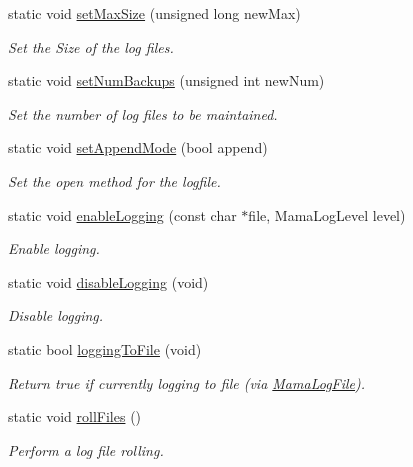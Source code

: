 \begin{DoxyCompactItemize}
\item 
static void \hyperlink{classWombat_1_1MamaLogFile_a4d47bedcb3fcbaf6f7b9cf86f5195173}{setMaxSize} (unsigned long newMax)
\begin{DoxyCompactList}\small\item\em Set the Size of the log files. \item\end{DoxyCompactList}\item 
static void \hyperlink{classWombat_1_1MamaLogFile_a29e1e1f8ca191340e7f1289af05fb3c0}{setNumBackups} (unsigned int newNum)
\begin{DoxyCompactList}\small\item\em Set the number of log files to be maintained. \item\end{DoxyCompactList}\item 
static void \hyperlink{classWombat_1_1MamaLogFile_ae7cfd9a633b4206e89f639c10bf144ac}{setAppendMode} (bool append)
\begin{DoxyCompactList}\small\item\em Set the open method for the logfile. \item\end{DoxyCompactList}\item 
static void \hyperlink{classWombat_1_1MamaLogFile_ad5b9f7b07ccf958ea340c582c89a13a1}{enableLogging} (const char $\ast$file, MamaLogLevel level)
\begin{DoxyCompactList}\small\item\em Enable logging. \item\end{DoxyCompactList}\item 
static void \hyperlink{classWombat_1_1MamaLogFile_afe285fd3230d67b3e565f4cafadfcf2b}{disableLogging} (void)
\begin{DoxyCompactList}\small\item\em Disable logging. \item\end{DoxyCompactList}\item 
static bool \hyperlink{classWombat_1_1MamaLogFile_a476c7a71ac0223dabc9a02928a46b657}{loggingToFile} (void)
\begin{DoxyCompactList}\small\item\em Return true if currently logging to file (via \hyperlink{classWombat_1_1MamaLogFile}{MamaLogFile}). \item\end{DoxyCompactList}\item 
static void \hyperlink{classWombat_1_1MamaLogFile_a00b206009ede2cff176b3fd9647e362b}{rollFiles} ()
\begin{DoxyCompactList}\small\item\em Perform a log file rolling. \item\end{DoxyCompactList}\end{DoxyCompactItemize}


